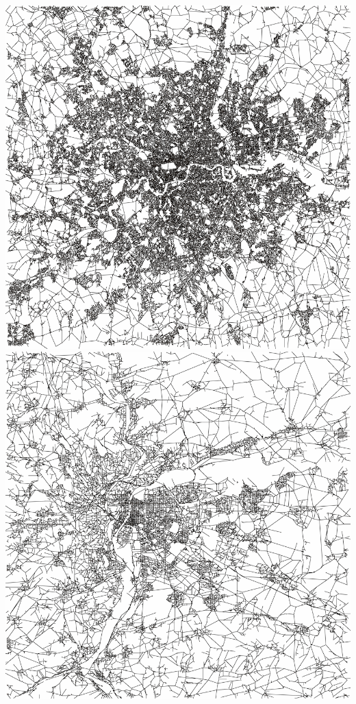 \documentclass[english,11pt]{beamer}
\begin{document}
{\begin{columns}
\centering
\includegraphics[width=\textwidth]{figures/nwanal_londonM25_lowres.png}\\
\includegraphics[width=\textwidth]{figures/nwanal_lyon_lowres.png}

\end{columns}}
\end{document}
